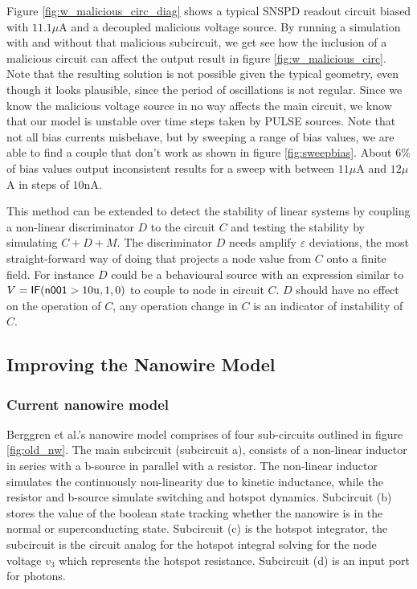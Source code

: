 Figure \ref{fig:w_malicious_circ_diag} shows a typical SNSPD readout circuit biased with $11.1\mu$A
and a decoupled
malicious voltage source. By running a simulation with and without that malicious subcircuit,
we get see how the inclusion of a malicious circuit can affect the output result in figure
\ref{fig:w_malicious_circ}. Note that the resulting solution is not possible given the
typical geometry, even though it looks plausible, since the period of oscillations is not 
regular. Since we know the malicious voltage source in no way affects the main circuit,
we know that our model is unstable over time steps taken by PULSE sources. Note that
not all bias currents misbehave, but by sweeping a range of bias values, we are able to
find a couple that don't work as shown in figure \ref{fig:sweepbias}. About $6\%$ of
bias values output inconsistent results for a sweep with between $11\mu$A and $12\mu$A 
in steps of $10$nA.

This method can be extended to detect the stability of linear systems by coupling
a non-linear discriminator $D$ to the circuit $C$ and testing the stability by simulating
$C+D+M$. The discriminator $D$ needs amplify $\varepsilon$ deviations, the most straight-forward
way of doing that projects a node value from $C$ onto a finite field. For instance $D$ 
could be a behavioural source with an expression similar to $V=\textsf{IF}(\textsf{n001}>10\mathrm{u}, 1, 0)$ 
to couple to node  in circuit $C$. $D$ should have no effect on the operation of $C$,
any operation change in $C$ is an indicator of instability of $C$.



\subsection{Improving the Nanowire Model}

\subsubsection{Current nanowire model}
\label{current_nw}

Berggren et al.'s nanowire model comprises of four sub-circuits outlined in figure \ref{fig:old_nw}. The main subcircuit (subcircuit a), consists of a
non-linear inductor in series with a b-source in parallel with a resistor.
The non-linear inductor simulates the continuously non-linearity due to kinetic inductance,
while the resistor and b-source simulate switching and hotspot dynamics.
Subcircuit (b) stores the value of the boolean state tracking 
whether the nanowire is in the normal or superconducting state.
Subcircuit (c) is the hotspot integrator, the subcircuit is the
circuit analog for the hotspot integral solving for the node voltage $v_3$
which represents the hotspot resistance. Subcircuit (d) is an input port for
photons.

